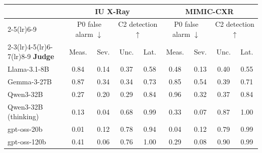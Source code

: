 \begin{tabular}{lcccccccc}
\toprule
 & \multicolumn{4}{c}{\textbf{IU X-Ray}} & \multicolumn{4}{c}{\textbf{MIMIC-CXR}} \\
\cmidrule(lr){2-5}\cmidrule(lr){6-9}
 & \multicolumn{2}{c}{P0 false alarm $\downarrow$} & \multicolumn{2}{c}{C2 detection $\uparrow$} & \multicolumn{2}{c}{P0 false alarm $\downarrow$} & \multicolumn{2}{c}{C2 detection $\uparrow$} \\
\cmidrule(lr){2-3}\cmidrule(lr){4-5}\cmidrule(lr){6-7}\cmidrule(lr){8-9}
\textbf{Judge} & Meas. & Sev. & Unc. & Lat. & Meas. & Sev. & Unc. & Lat. \\
\midrule
Llama-3.1-8B & 0.84 & 0.14 & 0.37 & 0.58 & 0.48 & 0.13 & 0.40 & 0.55 \\
Gemma-3-27B & 0.87 & 0.34 & 0.34 & 0.73 & 0.85 & 0.54 & 0.39 & 0.71 \\
Qwen3-32B & 0.27 & 0.20 & 0.29 & 0.84 & 0.96 & 0.32 & 0.37 & 0.84 \\
Qwen3-32B (thinking) & 0.13 & 0.04 & 0.68 & 0.99 & 0.33 & 0.07 & 0.87 & 1.00 \\
gpt-oss-20b & 0.01 & 0.12 & 0.78 & 0.94 & 0.04 & 0.12 & 0.79 & 0.99 \\
gpt-oss-120b & 0.41 & 0.06 & 0.76 & 1.00 & 0.29 & 0.08 & 0.90 & 0.99 \\
\bottomrule
\end{tabular}